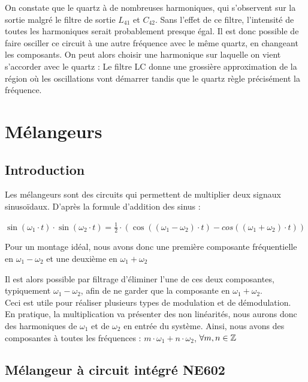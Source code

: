 \documentclass{article}
\begin{document}
On constate que le quartz à de nombreuses harmoniques, qui s'observent sur la sortie malgré le filtre de sortie $L_{41}$ et $C_{42}$. Sans l'effet de ce filtre, l'intensité de toutes les harmoniques serait probablement presque égal. Il est donc possible de faire osciller ce circuit à une autre fréquence avec le même quartz, en changeant les composants. On peut alors choisir une harmonique sur laquelle on vient s'accorder avec le quartz : Le filtre LC donne une grossière approximation de la région où les oscillations vont démarrer tandis que le quartz règle précisément la fréquence.


\section{Mélangeurs}

\subsection{Introduction}
Les mélangeurs sont des circuits qui permettent de multiplier deux signaux sinusoïdaux.
D'après la formule d'addition des sinus :
\begin{center}
$\sin(\omega_{1}\cdot t)\cdot \sin(\omega_{2}\cdot t) = \frac{1}{2}\cdot(\cos((\omega_{1} - \omega_{2})\cdot t) - cos((\omega_{1} + \omega_{2})\cdot t ) )$
\end{center}

Pour un montage idéal, nous avons donc une première composante fréquentielle en $\omega_{1} - \omega_{2}$ et une deuxième en $\omega_{1} + \omega_{2}$

Il est alors possible par filtrage d'éliminer l'une de ces deux composantes, typiquement $\omega_{1} - \omega_{2}$, afin de ne garder que la composante en $\omega_{1} + \omega_{2}$.\\

Ceci est utile pour réaliser plusieurs types de modulation et de démodulation.
\\
En pratique, la multiplication va présenter des non linéarités, nous aurons donc des harmoniques de $\omega_{1}$ et de $\omega_{2}$ en entrée du système.
Ainsi, nous avons des composantes à toutes les fréquences : $m \cdot \omega_{1} + n \cdot \omega_{2}$, $\forall m, n \in\mathbb{Z}$


\subsection{Mélangeur à circuit intégré NE602}
\end{document}
